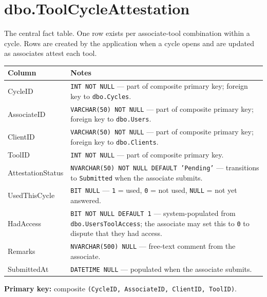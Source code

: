 \documentclass[12pt,a4paper]{report}
\begin{document}
\section{dbo.ToolCycleAttestation}

The central fact table. One row exists per associate-tool combination within a cycle. Rows are
created by the application when a cycle opens and are updated as associates attest each tool.

\begin{longtable}{>{\ttfamily}p{4.5cm} >{\raggedright\arraybackslash}p{9.5cm}}
\toprule
\normalfont\textbf{Column} & \textbf{Notes} \\
\midrule
\endhead
CycleID           & \texttt{INT NOT NULL} — part of composite primary key;
                    foreign key to \texttt{dbo.Cycles}. \\
AssociateID       & \texttt{VARCHAR(50) NOT NULL} — part of composite primary key;
                    foreign key to \texttt{dbo.Users}. \\
ClientID          & \texttt{VARCHAR(50) NOT NULL} — part of composite primary key;
                    foreign key to \texttt{dbo.Clients}. \\
ToolID            & \texttt{INT NOT NULL} — part of composite primary key. \\
AttestationStatus & \texttt{NVARCHAR(50) NOT NULL DEFAULT 'Pending'} — transitions to
                    \texttt{Submitted} when the associate submits. \\
UsedThisCycle     & \texttt{BIT NULL} — \texttt{1} = used, \texttt{0} = not used,
                    \texttt{NULL} = not yet answered. \\
HadAccess         & \texttt{BIT NOT NULL DEFAULT 1} — system-populated from
                    \texttt{dbo.UsersToolAccess}; the associate may set this to \texttt{0}
                    to dispute that they had access. \\
Remarks           & \texttt{NVARCHAR(500) NULL} — free-text comment from the associate. \\
SubmittedAt       & \texttt{DATETIME NULL} — populated when the associate submits. \\
\bottomrule
\end{longtable}

\textbf{Primary key:} composite \texttt{(CycleID, AssociateID, ClientID, ToolID)}.

\end{document}
